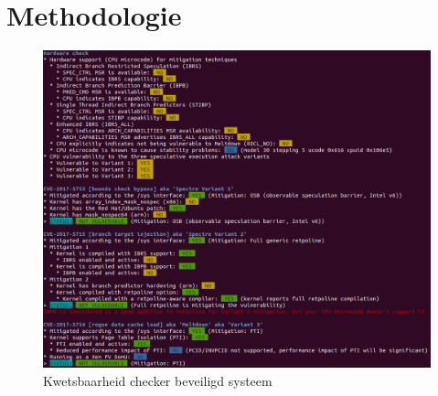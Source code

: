 
\chapter{Methodologie}
\label{ch:methodologie}



\begin{figure}
	\includegraphics[width=1.0\linewidth]{img/checker_patched.png}
	\caption{Kwetsbaarheid checker beveiligd systeem}
	\label{fig:checker_patched}
\end{figure}

